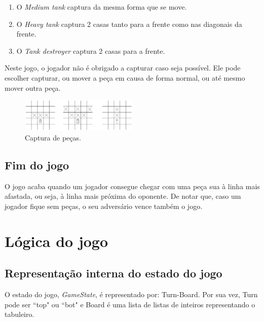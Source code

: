 \documentclass[a4paper,11pt,portuguese]{article}
\begin{document}
\begin{enumerate}[topsep=4pt,itemsep=2pt]
    \item O \textit{Medium tank} captura da mesma forma que se move.
    \item O \textit{Heavy tank} captura 2 casas tanto para a frente 
    como nas diagonais da frente.
    \item O \textit{Tank destroyer} captura 2 casas para a frente.
\end{enumerate}

\noindent Neste jogo, o jogador não é obrigado a capturar caso seja possível.
Ele pode escolher capturar, ou mover a peça em causa de forma normal, ou até
mesmo mover outra peça.

\begin{figure}[H]
    \centering
    \includegraphics[width=0.5\textwidth]{imgs/capture.png}
    \caption{Captura de peças.}
    \label{fig:capture}
\end{figure}

\subsection{Fim do jogo}

O jogo acaba quando um jogador consegue chegar com uma peça sua à linha mais
afastada, ou seja, à linha mais próxima do oponente.
De notar que, caso um jogador fique sem peças, o seu adversário vence também o jogo.


\section{Lógica do jogo}

    \subsection{Representação interna do estado do jogo}

    O estado do jogo, \textit{GameState}, é representado por: Turn-Board. Por sua vez, Turn pode ser ``top" ou ``bot"
    e Board é uma lista de listas de inteiros representando o tabuleiro.  
\end{document}
